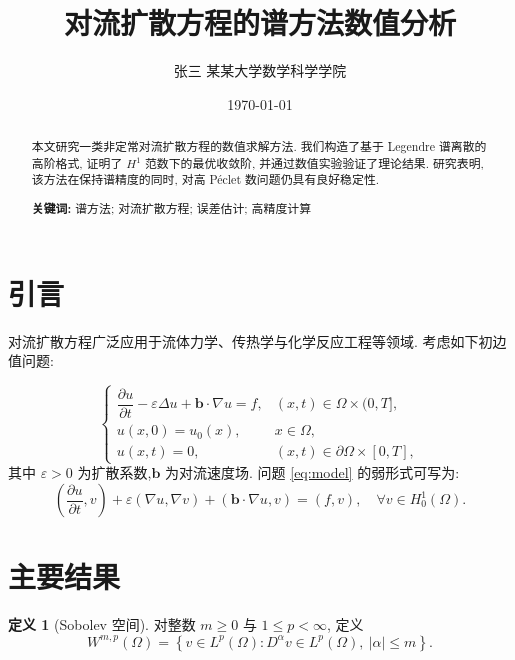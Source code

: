 \documentclass[11pt, a4paper]{ctexart}
\title{对流扩散方程的谱方法数值分析}
\author{张三 \quad 某某大学数学科学学院}
\date{\today}
\theoremstyle{definition}
\newtheorem{definition}[theorem]{定义}
\begin{document}
\maketitle

  \begin{abstract}
    \noindent 本文研究一类非定常对流扩散方程的数值求解方法. 我们构造了基于 Legendre 谱离散的高阶格式,
    证明了 $H^1$ 范数下的最优收敛阶, 并通过数值实验验证了理论结果. 研究表明, 该方法在保持谱精度的同时, 对高 Péclet 数问题仍具有良好稳定性.

    \textbf{关键词:} 谱方法; 对流扩散方程; 误差估计; 高精度计算
  \end{abstract}

  \tableofcontents \newpage

  \section{引言}
  \label{sec:intro}

  对流扩散方程广泛应用于流体力学、传热学与化学反应工程等领域\cite{knuth1984tex}. 考虑如下初边值问题: 

  \begin{equation}
    \label{eq:model}
    \begin{cases}
      \dfrac{\partial u}{\partial t} - \varepsilon \Delta u + \mathbf{b}\cdot\nabla u = f, & (x,t)\in\Omega\times(0,T],\\[4pt] u(x,0) = u_0(x), & x\in\Omega,\\
      u(x,t) = 0, & (x,t)\in\partial\Omega\times[0,T],
    \end{cases}
  \end{equation}
  其中 $\varepsilon>0$ 为扩散系数,$\mathbf{b}$ 为对流速度场. 问题 \eqref{eq:model} 的弱形式可写为:
  \[
  \left( \frac{\partial u}{\partial t}, v \right) + \varepsilon (\nabla u, \nabla v) + (\mathbf{b}\cdot\nabla u, v) = (f, v), \quad \forall v \in H_0^1(\Omega). 
  \]



  \section{主要结果}
  \label{sec:result}

  \begin{definition}[Sobolev 空间]
    对整数 $m\ge 0$ 与 $1\le p<\infty$, 定义
    \[
    W^{m,p}(\Omega) = \left\{ v\in L^p(\Omega): D^{\alpha}v \in L^p(\Omega),\ |\alpha|\le m \right\}.
    \]
  \end{definition}
\end{document}
